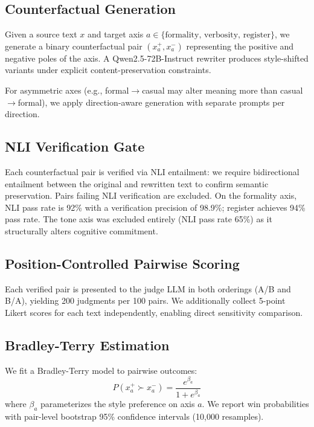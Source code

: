 \documentclass[11pt,a4paper]{article}
\begin{document}
\subsection{Counterfactual Generation}

Given a source text $x$ and target axis $a \in \{\text{formality, verbosity, register}\}$, we generate a binary counterfactual pair $(x^+_a, x^-_a)$ representing the positive and negative poles of the axis. A Qwen2.5-72B-Instruct rewriter produces style-shifted variants under explicit content-preservation constraints.

For asymmetric axes (e.g., formal$\to$casual may alter meaning more than casual$\to$formal), we apply direction-aware generation with separate prompts per direction.

\subsection{NLI Verification Gate}

Each counterfactual pair is verified via NLI entailment: we require bidirectional entailment between the original and rewritten text to confirm semantic preservation. Pairs failing NLI verification are excluded. On the formality axis, NLI pass rate is 92\% with a verification precision of 98.9\%; register achieves 94\% pass rate. The tone axis was excluded entirely (NLI pass rate 65\%) as it structurally alters cognitive commitment.

\subsection{Position-Controlled Pairwise Scoring}

Each verified pair is presented to the judge LLM in both orderings (A/B and B/A), yielding 200 judgments per 100 pairs. We additionally collect 5-point Likert scores for each text independently, enabling direct sensitivity comparison.

\subsection{Bradley-Terry Estimation}

We fit a Bradley-Terry model to pairwise outcomes:
\begin{equation}
P(x^+_a \succ x^-_a) = \frac{e^{\beta_a}}{1 + e^{\beta_a}}
\end{equation}
where $\beta_a$ parameterizes the style preference on axis $a$. We report win probabilities with pair-level bootstrap 95\% confidence intervals (10,000 resamples).
\end{document}
